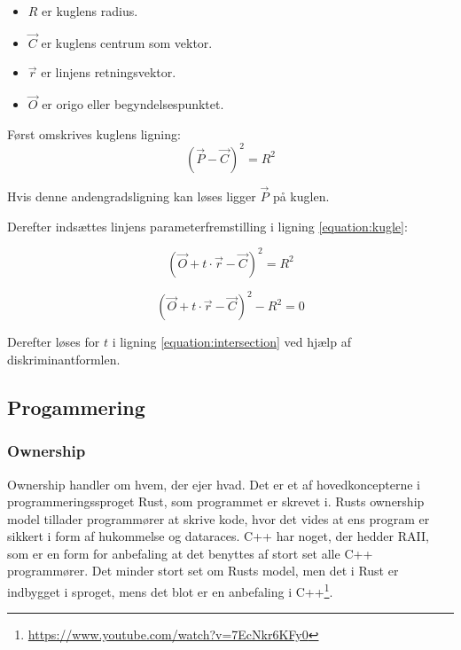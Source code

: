 \documentclass{article}
\begin{document}
\begin{flushleft}
    \begin{itemize}
        \item \(R\) er kuglens radius.
        \item \(\vec{C}\) er kuglens centrum som vektor.
        \item \(\vec{r}\) er linjens retningsvektor.
        \item \(\vec{O}\) er origo eller begyndelsespunktet.
    \end{itemize}

    Først omskrives kuglens ligning:
    \begin{equation}
        (\vec{P} - \vec{C})^2 = R^2
        \label{equation:kugle}
    \end{equation}

    Hvis denne andengradsligning kan løses ligger \(\vec{P}\) på kuglen.

    Derefter indsættes linjens parameterfremstilling i ligning \ref{equation:kugle}:

    \begin{equation}
        (\vec{O} + t \cdot \vec{r} - \vec{C})^2 = R^2
    \end{equation}

    \begin{equation}
        (\vec{O} + t \cdot \vec{r} - \vec{C})^2 - R^2 = 0
        \label{equation:intersection}
    \end{equation}

    Derefter løses for \(t\) i ligning \ref{equation:intersection} ved hjælp af diskriminantformlen.

    \subsection{Progammering}

    \subsubsection{Ownership}

    Ownership handler om hvem, der ejer hvad. Det er et af hovedkoncepterne i programmeringssproget Rust, som programmet er skrevet i.
    Rusts ownership model tillader programmører at skrive kode, hvor det vides at ens program er sikkert i form af hukommelse og dataraces.
    C++ har noget, der hedder RAII, som er en form for anbefaling at det benyttes af stort set alle C++ programmører.
    Det minder stort set om Rusts model, men det i Rust er indbygget i sproget, mens det blot er en anbefaling i C++\footnote{\url{https://www.youtube.com/watch?v=7EcNkr6KFy0}}.


\end{flushleft}
\end{document}
